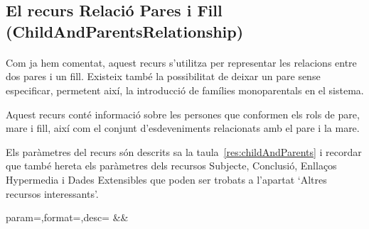 \subsection{El recurs Relació Pares i Fill (ChildAndParentsRelationship)}

    \paragraph{}
    Com ja hem comentat, aquest recurs s'utilitza per representar les relacions entre dos pares i un fill. Existeix també la possibilitat de deixar un pare sense especificar, permetent així, la introducció de famílies monoparentals en el sistema.

    Aquest recurs conté informació sobre les persones que conformen els rols de pare, mare i fill, així com el conjunt d'esdeveniments relacionats amb el pare i la mare.

    Els paràmetres del recurs són descrits sa la taula~\ref{res:childAndParents} i recordar que també hereta els paràmetres dels recursos Subjecte, Conclusió, Enllaços Hypermedia i Dades Extensibles que poden ser trobats a l'apartat `Altres recursos interessants'.

    \begin{center}
             {param=\param,format=\format,desc=\desc}
             {\param&\format&\desc}
     \end{center}
